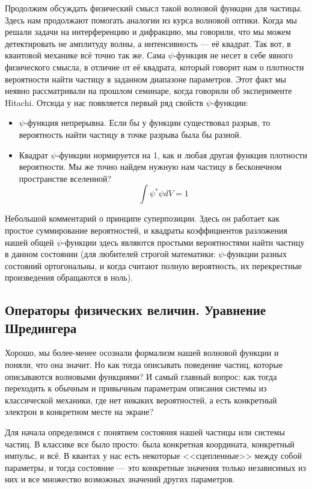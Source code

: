 \documentclass[12pt]{article}
\begin{document}
\vspace{1em} \noindent
Продолжим обсуждать физический смысл такой волновой функции для частицы. Здесь нам продолжают помогать аналогии из курса волновой оптики. Когда мы решали задачи на интерференцию и дифракцию, мы говорили, что мы можем детектировать не амплитуду волны, а интенсивность --- её квадрат. Так вот, в квантовой механике всё точно так же. Сама $\psi$-функция  не несет в себе явного физического смысла, в отличие от её квадрата, который говорит нам о плотности вероятности найти частицу в заданном диапазоне параметров. Этот факт мы неявно рассматривали на прошлом семинаре, когда говорили об эксперименте Hitachi.  Отсюда у нас появляется первый ряд свойств $\psi$-функции:
\begin{itemize}
    \item $\psi$-функция непрерывна. Если бы у функции существовал разрыв, то вероятность найти частицу в точке разрыва была бы разной.
    \item Квадрат $\psi$-функции нормируется на 1, как и любая другая функция плотности вероятности. Мы же точно найдем нужную нам частицу в бесконечном пространстве вселенной? $$\int\psi^*\psi dV = 1$$
\end{itemize}
Небольшой комментарий о принципе суперпозиции. Здесь он работает как простое суммирование вероятностей, и квадраты коэффициентов разложения нашей общей $\psi$-функции здесь являются простыми вероятностями найти частицу в данном состоянии (для любителей строгой математики: $\psi$-функции разных состояний ортогональны, и когда считают полную вероятность, их перекрестные произведения обращаются в ноль).

\subsection{Операторы физических величин. Уравнение Шредингера}
Хорошо, мы более-менее осознали формализм нашей волновой функции и поняли, что она значит. Но как тогда описывать поведение частиц, которые описываются волновыми функциями? И самый главный вопрос: как тогда переходить к обычным и привычным параметрам описания системы из классической механики, где нет никаких вероятностей, а есть конкретный электрон в конкретном месте на экране?

\vspace{1em} \noindent
Для начала определимся с понятием состояния нашей частицы или системы частиц. В классике все было просто: была конкретная координата, конкретный импульс, и всё. В квантах у нас есть некоторые <<сцепленные>> между собой параметры, и тогда состояние --- это конкретные значения только независимых из них и все множество возможных значений других параметров.
\end{document}
